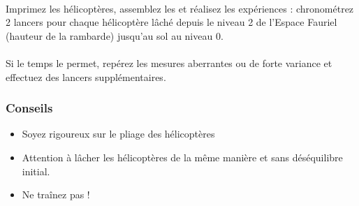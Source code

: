 \documentclass[a4paper,10pt]{article}
\begin{document}
\paragraph{}
Imprimez les hélicoptères, assemblez les et réalisez les expériences : chronométrez 2 lancers pour chaque hélicoptère lâché depuis le niveau 2 de l'Espace Fauriel (hauteur de la rambarde) jusqu'au sol au niveau 0. 

\paragraph{}
Si le temps le permet, repérez les mesures aberrantes ou de forte variance et effectuez des lancers supplémentaires.

\subsubsection*{Conseils}
\begin{itemize}
 \item Soyez rigoureux sur le pliage des hélicoptères
 \item Attention à lâcher les hélicoptères de la même manière et sans déséquilibre initial.
 \item Ne traînez pas !
\end{itemize}
\end{document}

